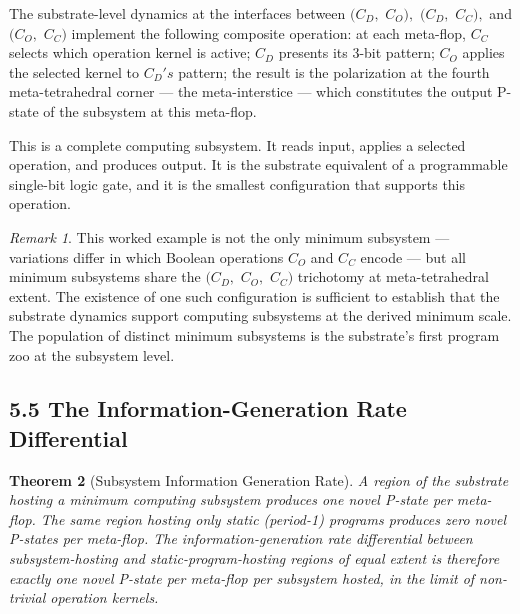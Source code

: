 \documentclass[11pt,oneside]{report}
\newtheorem{theorem}{Theorem}[section]
\theoremstyle{definition}
\theoremstyle{remark}
\newtheorem{remark}[theorem]{Remark}
\begin{document}
The substrate-level dynamics at the interfaces between \ensuremath{(C_{D},} \ensuremath{C_{O}),}
\ensuremath{(C_{D},} \ensuremath{C_{C}),} and \ensuremath{(C_{O},} \ensuremath{C_{C})} implement the following composite
operation: at each meta-flop, \ensuremath{C_{C}} selects which operation kernel is
active; \ensuremath{C_{D}} presents its 3-bit pattern; \ensuremath{C_{O}} applies the selected
kernel to \ensuremath{C_{D}'s} pattern; the result is the polarization at the fourth
meta-tetrahedral corner --- the meta-interstice --- which constitutes
the output P-state of the subsystem at this meta-flop.

This is a complete computing subsystem. It reads input, applies a
selected operation, and produces output. It is the substrate equivalent
of a programmable single-bit logic gate, and it is the smallest
configuration that supports this operation.

\begin{remark}
This worked example is not the only minimum subsystem ---
variations differ in which Boolean operations \ensuremath{C_{O}} and \ensuremath{C_{C}} encode ---
but all minimum subsystems share the \ensuremath{(C_{D},} \ensuremath{C_{O},} \ensuremath{C_{C})} trichotomy at
meta-tetrahedral extent. The existence of one such configuration is
sufficient to establish that the substrate dynamics support computing
subsystems at the derived minimum scale. The population of distinct
minimum subsystems is the substrate's first program zoo at the subsystem
level.
\end{remark}

\subsection*{5.5 The Information-Generation Rate Differential}

\begin{theorem}[Subsystem Information Generation Rate]
A region of the
substrate hosting a minimum computing subsystem produces one novel
P-state per meta-flop. The same region hosting only static (period-1)
programs produces zero novel P-states per meta-flop. The
information-generation rate differential between subsystem-hosting and
static-program-hosting regions of equal extent is therefore exactly one
novel P-state per meta-flop per subsystem hosted, in the limit of
non-trivial operation kernels.
\end{theorem}
\end{document}
